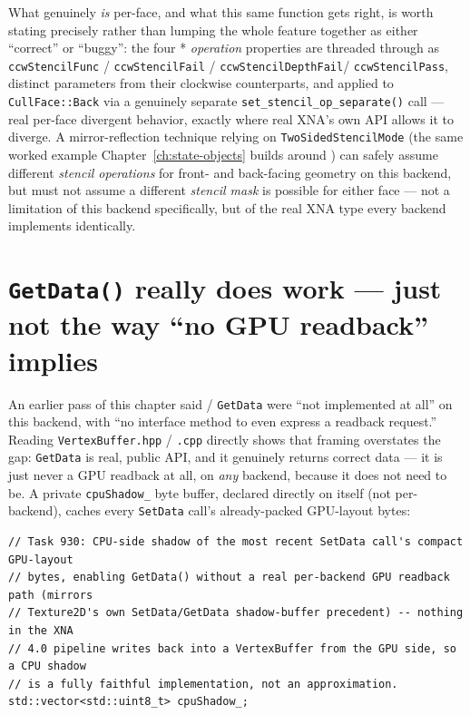 What genuinely \emph{is} per-face, and what this same function gets right, is worth stating
precisely rather than lumping the whole feature together as either ``correct'' or ``buggy'':
the four * \emph{operation} properties are threaded through
as \texttt{ccwStencilFunc} / \texttt{ccwStencilFail} / \texttt{ccwStencilDepthFail}/%
\texttt{ccwStencilPass}, distinct parameters from their clockwise counterparts, and applied to
\texttt{CullFace::Back} via a genuinely separate \texttt{set\_stencil\_op\_separate()} call ---
real per-face divergent behavior, exactly where real XNA's own API allows it to diverge. A
mirror-reflection technique relying on \texttt{TwoSidedStencilMode} (the same worked example
Chapter~\ref{ch:state-objects} builds around ) can safely assume
different \emph{stencil operations} for front- and back-facing geometry on this backend, but
must not assume a different \emph{stencil mask} is possible for either face --- not a
limitation of this backend specifically, but of the real XNA type every backend implements
identically.

\section{\texttt{GetData()} really does work --- just not the way ``no GPU readback'' implies}
\label{sec:easygl-getdata-shadow}

An earlier pass of this chapter said  / 
\texttt{GetData} were ``not implemented at all'' on this backend, with ``no interface method
to even express a readback request.'' Reading \texttt{VertexBuffer.hpp} / \texttt{.cpp} directly
shows that framing overstates the gap: \texttt{GetData} is real, public API, and it genuinely
returns correct data --- it is just never a GPU readback at all, on \emph{any} backend,
because it does not need to be. A private \texttt{cpuShadow\_} byte buffer, declared directly
on  itself (not per-backend), caches every \texttt{SetData} call's
already-packed GPU-layout bytes:

\begin{lstlisting}
// Task 930: CPU-side shadow of the most recent SetData call's compact GPU-layout
// bytes, enabling GetData() without a real per-backend GPU readback path (mirrors
// Texture2D's own SetData/GetData shadow-buffer precedent) -- nothing in the XNA
// 4.0 pipeline writes back into a VertexBuffer from the GPU side, so a CPU shadow
// is a fully faithful implementation, not an approximation.
std::vector<std::uint8_t> cpuShadow_;
\end{lstlisting}

